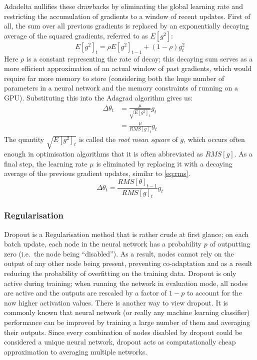 Adadelta nullifies these drawbacks by eliminating the global learning rate and
restricting the accumulation of gradients to a window of recent updates. First
of all, the sum over all previous gradients is replaced by an exponentially
decaying average of the squared gradients, referred to as $E[g^2]$:
\begin{equation}\label{eq:rms}
  E[g^2]_t = \rho E[g^2]_{t-1} + (1 - \rho) g_t^2
\end{equation}
Here $\rho$ is a constant representing the rate of decay; this decaying sum
serves as a more efficient approximation of an actual window of past gradients,
which would require far more memory to store (considering both the huge number
of parameters in a neural network and the memory constraints of running on a GPU).
Substituting this into the Adagrad algorithm gives us:
\begin{align}
  \Delta\theta_t &= \frac{\mu}{\sqrt{E[g^2]_t}} g_{t} \\
		 &= \frac{\mu}{RMS[g]_t} g_{t}
\end{align}
The quantity $\sqrt{E[g^2]_t}$ is called the \emph{root mean square} of $g$,
which occurs often enough in optimisation algorithms that it is often
abbreviated as $RMS[g]$. As a final step, the learning rate $\mu$ is eliminated
by replacing it with a decaying average of the previous gradient updates,
similar to \cref{eq:rms}.
\begin{equation}
  \Delta\theta_t = \frac{RMS[\theta]_{t-1}}{RMS[g]_t} g_{t}
\end{equation}

\subsubsection{Regularisation}\label{sec:reg}
Dropout\citep{dropout} is a Regularisation method that is rather crude at first
glance; on each batch update, each node in the neural network has a probability
$p$ of outputting zero (i.e.\ the node being ``disabled''). As a result, nodes
cannot rely on the output of any other node being present, preventing
co-adaptation and as a result reducing the probability of overfitting on the
training data. Dropout is only active during training; when running the network
in evaluation mode, all nodes are active and the outputs are rescaled by a
factor of $1 - p$ to account for the now higher activation values.
There is another way to view dropout. It is commonly known that neural network
(or really any machine learning classifier) performance can be improved by
training a large number of them and averaging their outputs. Since every
combination of nodes disabled by dropout could be considered a unique neural
network, dropout acts as computationally cheap approximation to averaging
multiple networks.

